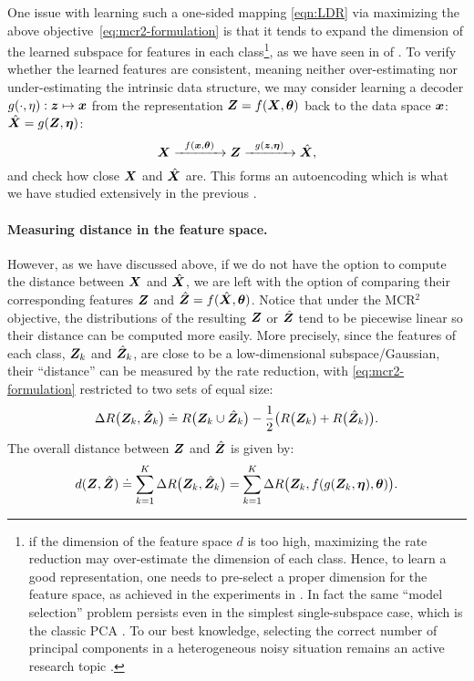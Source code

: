 \documentclass[../../book-main.tex]{subfiles}
\begin{document}
{One issue with learning such a one-sided mapping \eqref{eqn:LDR} via  maximizing the above \mbox{objective \eqref{eq:mcr2-formulation}} is that it tends to expand the dimension of the learned subspace for features in each class\footnote{if the dimension of the feature space $d$ is too high, maximizing the rate reduction may over-estimate the dimension of each class. Hence, to learn a good representation, one needs to pre-select a proper dimension for the feature space, as achieved in the experiments in \cite{yu2020learning}. In fact the same ``model selection'' problem persists even in the simplest single-subspace case, which is the classic PCA \cite{Jolliffe1986}. To our best knowledge, selecting the correct number of principal components in a heterogeneous noisy situation remains an active research topic \cite{hong2020selecting}.}, as we have seen in  of . To verify whether the learned features are consistent, meaning neither over-estimating nor under-estimating the intrinsic data structure, we may consider learning a decoder $g(\cdot,\eta): \bm{z} \mapsto  \bm{x}$ from the representation $\bm{Z} = f(\bm{X},\bm\theta)$ back to the data space $\bm{x}$: $\hat {\bm{X}} = g(\bm{Z}, \bm\eta)$:
\begin{equation}
    \bm{X} \xrightarrow{\hspace{2mm} f(\bm{x}, \bm\theta)\hspace{2mm}} \bm{Z} \xrightarrow{\hspace{2mm} g(\bm{z}, \bm \eta) \hspace{2mm}} \hat {\bm{X}}, 
    \label{eqn:autoencoding-ch6}
\end{equation}
and check how close $\bm{X}$ and $\hat {\bm{X}}$ are. This forms an autoencoding which is  what we have studied extensively in the previous .

\paragraph{Measuring distance in the feature space.}
However, as we have discussed above, if we do not have the option to compute the distance between $\bm{X}$ and $\hat {\bm{X}}$, we are left with the option of comparing their corresponding features $\bm{Z}$ and $\hat {\bm{Z}} = f(\hat {\bm{X}}, \bm \theta)$. Notice that under the MCR$^2$ objective, the distributions of the resulting $\bm{Z}$ or $\hat {\bm{Z}}$ tend to be piecewise linear so  their distance can be  computed more easily. More precisely, since the features of each class, $\bm{Z}_k$ and $\hat{\bm{Z}}_k$, are close to be a low-dimensional subspace/Gaussian, their ``distance'' can be measured by the rate reduction, {with \eqref{eq:mcr2-formulation} restricted to two sets of equal size}:
\begin{equation}
\Delta R\big(\bm{Z}_k, \hat{\bm{Z}}_k\big) \doteq R\big(\bm{Z}_k \cup \hat{\bm{Z}}_k\big) - \frac{1}{2} \big( R\big(\bm{Z}_k) + R\big(\hat {\bm{Z}}_k)\big).
\end{equation}
The overall distance between $\bm{Z}$ and $\hat {\bm{Z}}$ is given by:
\begin{equation}
d(\bm{Z}, \hat {\bm{Z}}) \doteq   \sum_{k=1}^K \Delta R\big(\bm{Z}_k, \hat{\bm{Z}}_k\big) =  \sum_{k=1}^K \Delta R\big(\bm{Z}_k, f(g(\bm{Z}_k, \bm\eta),\bm \theta)\big).
\label{eqn:Z-distance}
\end{equation}


}
\end{document}
